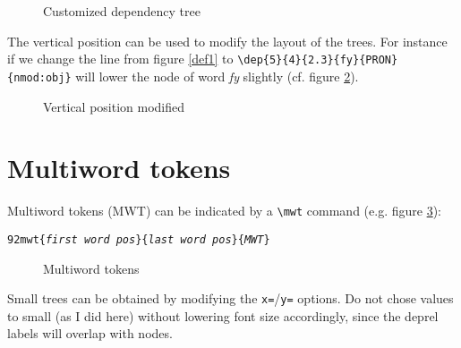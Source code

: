 \documentclass[12pt]{article}
\begin{document}
\begin{figure}[H]
\beispiel
\caption{Customized dependency tree}\label{ex2}
\end{figure}



The vertical position can be used to modify the layout of the
trees. For instance if we change the line from figure \ref{def1}
to \verb+\dep{5}{4}{2.3}{fy}{PRON}{nmod:obj}+
 will lower the node of
word \emph{fy} slightly (cf. figure \ref{ex3}).



\begin{figure}[H]
\caption{Vertical position modified}\label{ex3}
\end{figure}


\section{Multiword tokens}
Multiword tokens (MWT) can be indicated by a \verb:\mwt: command
(e.g. figure \ref{ex4}):

 {\tt\char92mwt\{\emph{first word pos}\}\{\emph{last word
     pos}\}\{\emph{MWT}\}} 



\begin{figure}[H]
\caption{Multiword tokens}\label{ex4}
\end{figure}



Small trees can be obtained by modifying the \verb:x=:/\verb:y=:
options. Do not chose values to small (as I did here) without lowering
font size accordingly, since the
deprel labels will overlap with nodes.
\end{document}
